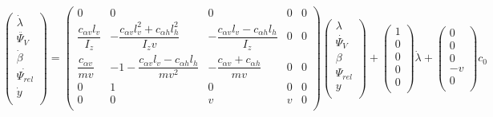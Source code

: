 \begin{equation}
    \left(
    \begin{array}{c}
            \dot{\lambda}    \\
            \ddot{\Psi_V}    \\
            \dot{\beta}      \\
            \dot{\Psi_{rel}} \\
            \dot{y}          \\
        \end{array}
    \right)=
    \left(
    \begin{array}{ccccc}
            0                                & 0                                                        & 0                                                   & 0 & 0 \\
            \dfrac{c_{\alpha v}l_{v}}{I_{z}} & -\dfrac{c_{\alpha v}l_{v}^2+c_{\alpha h}l_{h}^2}{I_{z}v} & -\dfrac{c_{\alpha v}l_{v}-c_{\alpha h}l_{h}}{I_{z}} & 0 & 0 \\
            \dfrac{c_{\alpha v}}{mv}         & -1-\dfrac{c_{\alpha v}l_{v}-c_{\alpha h}l_{h}}{mv^2}     & -\dfrac{c_{\alpha v}+c_{\alpha h}}{mv}              & 0 & 0 \\
            0                                & 1                                                        & 0                                                   & 0 & 0 \\
            0                                & 0                                                        & v                                                   & v & 0 \\
        \end{array}
    \right)
    \left(
    \begin{array}{c}
            \lambda      \\
            \dot{\Psi_V} \\
            \beta        \\
            \Psi_{rel}   \\
            y            \\
        \end{array}
    \right)+
    \left(
    \begin{array}{c}
            1 \\
            0 \\
            0 \\
            0 \\
            0 \\
        \end{array}
    \right)\dot{\lambda}+
    \left(
    \begin{array}{c}
            0  \\
            0  \\
            0  \\
            -v \\
            0  \\
        \end{array}
    \right)c_0
\end{equation}
